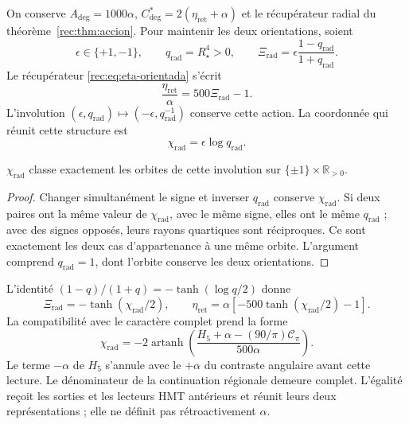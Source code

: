 On conserve $A_{\deg}=1000\alpha$,
$C^*_{\deg}=2(\eta_{\mathrm{ret}}+\alpha)$ et le récupérateur radial du
théorème~\ref{rec:thm:accion}. Pour maintenir les deux orientations, soient
\begin{equation}
 \epsilon\in\{+1,-1\},\qquad
 q_{\mathrm{rad}}=R_\star^4>0,\qquad
 \Xi_{\mathrm{rad}}=
 \epsilon\frac{1-q_{\mathrm{rad}}}{1+q_{\mathrm{rad}}}.
 \label{md:restop:par-radial}
\end{equation}
Le récupérateur \eqref{rec:eq:eta-orientada} s’écrit
\begin{equation}
 \frac{\eta_{\mathrm{ret}}}{\alpha}=500\Xi_{\mathrm{rad}}-1.
 \label{md:restop:recuperador}
\end{equation}
L’involution
$(\epsilon,q_{\mathrm{rad}})
 \mapsto(-\epsilon,q_{\mathrm{rad}}^{-1})$
conserve cette action. La coordonnée qui réunit cette structure est
\begin{equation}
 \boxed{\chi_{\mathrm{rad}}=\epsilon\log q_{\mathrm{rad}}.}
 \label{md:restop:chi}
\end{equation}

\begin{proposition}
\label{md:restop:proposicion-orbitas}
$\chi_{\mathrm{rad}}$ classe exactement les orbites de cette involution
sur $\{\pm1\}\times\mathbb R_{>0}$.
\end{proposition}
\begin{proof}
Changer simultanément le signe et inverser $q_{\mathrm{rad}}$ conserve
$\chi_{\mathrm{rad}}$. Si deux paires ont la même valeur de
$\chi_{\mathrm{rad}}$, avec le même signe, elles ont le même
$q_{\mathrm{rad}}$ ; avec des signes opposés, leurs rayons quartiques sont
réciproques. Ce sont exactement les deux cas d’appartenance à une même
orbite. L’argument comprend $q_{\mathrm{rad}}=1$, dont l’orbite conserve
les deux orientations.
\end{proof}

L’identité
$(1-q)/(1+q)=-\tanh(\log q/2)$ donne
\begin{equation}
 \Xi_{\mathrm{rad}}
 =-\tanh(\chi_{\mathrm{rad}}/2),\qquad
 \boxed{\eta_{\mathrm{ret}}
 =\alpha[-500\tanh(\chi_{\mathrm{rad}}/2)-1].}
 \label{md:restop:accion-chi}
\end{equation}
La compatibilité avec le caractère complet prend la forme
\begin{equation}
 \boxed{\chi_{\mathrm{rad}}
 =-2\operatorname{artanh}
 \left(\frac{H_5+\alpha-(90/\pi)\mathcal C_\pi}{500\alpha}\right).}
 \label{md:restop:chi-caracter}
\end{equation}
Le terme $-\alpha$ de $H_5$ s’annule avec le $+\alpha$ du
contraste angulaire avant cette lecture. Le dénominateur de la
continuation régionale demeure complet. L’égalité reçoit les
sorties et les lecteurs HMT antérieurs et réunit leurs deux représentations ;
elle ne définit pas rétroactivement $\alpha$.

